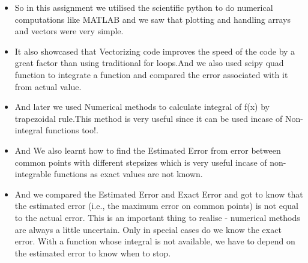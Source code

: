 \documentclass[a4paper]{article}
\begin{document}
	\begin{itemize}
	\item So in this assignment we utilised the scientific python to do numerical computations like MATLAB and we saw that plotting and handling arrays and vectors were very simple. \\
    \item It also showcased that Vectorizing code improves the speed of the code by a great factor than using traditional for loops.And we also used scipy quad function to integrate a function and compared the error associated with it from actual value. 
    \item And later we used Numerical methods to calculate integral of f(x)  by trapezoidal rule.This method is very useful since it can be used incase of Non-integral functions too!.
    \item And We also learnt how to find the Estimated Error from error between common points with different stepsizes which is very useful  incase of non-integrable functions as exact values are not known.
    \item And we compared the Estimated Error and Exact Error and got to know that the estimated error (i.e., the maximum error on common points) is not equal to the actual error. This is an
important thing to realise - numerical methods are always a little uncertain.
Only in special cases do we know the exact error. With a function whose
integral is not available, we have to depend on the estimated error to know
when to stop.
	\end{itemize}


    
    
\end{document}
